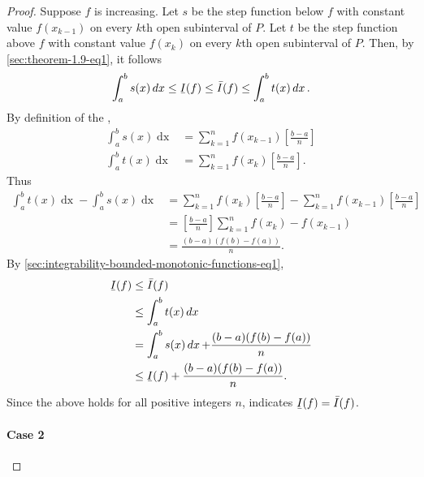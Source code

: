 \documentclass{report}
\begin{document}
\begin{proof}
    Suppose $f$ is increasing.
    Let $s$ be the step function below $f$ with constant value $f(x_{k-1})$
      on every $k$th open subinterval of $P$.
    Let $t$ be the step function above $f$ with constant value $f(x_k)$
      on every $k$th open subinterval of $P$.
    Then, by \eqref{sec:theorem-1.9-eq1}, it follows
      \begin{equation}
        \label{sec:integrability-bounded-monotonic-functions-eq1}
        \int_a^b s(x) \mathop{dx} \leq \ubar{I}(f)
          \leq \bar{I}(f) \leq \int_a^b t(x) \mathop{dx}.
      \end{equation}
    By definition of the ,
      \begin{align*}
        \int_a^b s(x) \mathop{dx}
          & = \sum_{k=1}^n f(x_{k-1})\left[\frac{b - a}{n}\right] \\
        \int_a^b t(x) \mathop{dx}
          & = \sum_{k=1}^n f(x_k)\left[\frac{b - a}{n}\right].
      \end{align*}
    Thus
      \begin{align*}
        \int_a^b t(x) \mathop{dx} - \int_a^b s(x) \mathop{dx}
          & = \sum_{k=1}^n f(x_k)\left[\frac{b - a}{n}\right] -
              \sum_{k=1}^n f(x_{k-1})\left[\frac{b - a}{n}\right] \\
          & = \left[\frac{b - a}{n}\right] \sum_{k=1}^n f(x_k) - f(x_{k-1}) \\
          & = \frac{(b - a)(f(b) - f(a))}{n}.
      \end{align*}
    By \eqref{sec:integrability-bounded-monotonic-functions-eq1},
      \begin{align*}
        \ubar{I}(f)
          & \leq \bar{I}(f) \\
          & \leq \int_a^b t(x) \mathop{dx} \\
          & = \int_a^b s(x) \mathop{dx} + \frac{(b - a)(f(b) - f(a))}{n} \\
          & \leq \ubar{I}(f) + \frac{(b - a)(f(b) - f(a))}{n}.
      \end{align*}
    Since the above holds for all positive integers $n$,
       indicates $\ubar{I}(f) = \bar{I}(f)$.

  \paragraph{Case 2}%


\end{proof}
\end{document}
